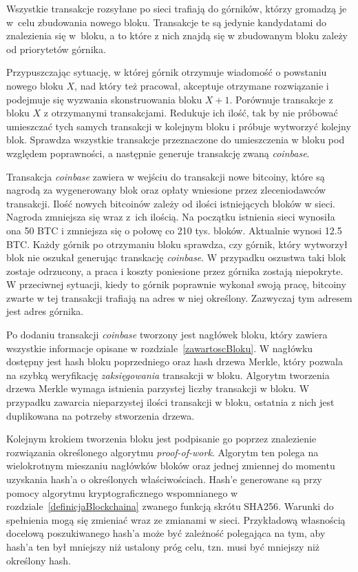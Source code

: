 \documentclass[12pt, twoside, final, openany]{mgr}
\begin{document}
\indent Wszystkie transakcje rozsyłane po sieci trafiają do górników, którzy gromadzą je w~celu zbudowania nowego bloku. Transakcje te są jedynie kandydatami do znalezienia się w~bloku, a to które z nich znajdą się w zbudowanym bloku zależy od priorytetów górnika. 

\indent Przypuszczając sytuację, w której górnik otrzymuje wiadomość o powstaniu nowego bloku $X$, nad który też pracował, akceptuje otrzymane rozwiązanie i podejmuje się wyzwania skonstruowania bloku $X+1$. Porównuje transakcje z bloku $X$ z otrzymanymi transakcjami. Redukuje ich ilość, tak by nie próbować umieszczać tych samych transakcji w kolejnym bloku i próbuje wytworzyć kolejny blok. Sprawdza wszystkie transakcje przeznaczone do umieszczenia w bloku pod względem poprawności, a następnie generuje transakcję zwaną \textit{coinbase}. 

\indent Transakcja \textit{coinbase} zawiera w wejściu do transakcji nowe bitcoiny, które są nagrodą za wygenerowany blok oraz opłaty wniesione przez zleceniodawców transakcji. Ilość nowych bitcoinów zależy od ilości istniejących bloków w sieci. Nagroda zmniejsza się wraz z~ich ilością. Na początku istnienia sieci wynosiła ona 50 BTC i zmniejsza się o połowę co 210 tys. bloków. Aktualnie wynosi 12.5 BTC. Każdy górnik po otrzymaniu bloku sprawdza, czy górnik, który wytworzył blok nie oszukał generując transkację \textit{coinbase}. W przypadku oszustwa taki blok zostaje odrzucony, a praca i koszty poniesione przez górnika zostają niepokryte. W przeciwnej sytuacji, kiedy to górnik poprawnie wykonał swoją pracę, bitcoiny zwarte w tej transakcji trafiają na adres w niej określony. Zazwyczaj tym adresem jest adres górnika.

\indent Po dodaniu transakcji \textit{coinbase} tworzony jest nagłówek bloku, który zawiera wszystkie informacje opisane w rozdziale~\ref{zawartoscBloku}. W nagłówku dostępny jest hash bloku poprzedniego oraz hash drzewa Merkle, który pozwala na szybką weryfikację \textit{zaksięgowania} transakcji w bloku. Algorytm tworzenia drzewa Merkle wymaga istnienia parzystej liczby transakcji w bloku. W przypadku zawarcia nieparzystej ilości transakcji w bloku, ostatnia z nich jest duplikowana na potrzeby stworzenia drzewa.

\indent Kolejnym krokiem tworzenia bloku jest podpisanie go poprzez znalezienie rozwiązania określonego algorytmu \textit{proof-of-work}. Algorytm ten polega na wielokrotnym mieszaniu nagłówków bloków oraz jednej zmiennej do momentu uzyskania hash'a o określonych właściwościach. Hash'e generowane są przy pomocy algorytmu kryptograficznego wspomnianego w rozdziale~\ref{definicjaBlockchaina} zwanego funkcją skrótu SHA256\cite{podstawyKryptografii}. Warunki do spełnienia mogą się zmieniać wraz ze zmianami w sieci. Przykładową własnością docelową poszukiwanego hash'a może być zależność polegająca na tym, aby hash'a ten był mniejszy niż ustalony próg celu, tzn. musi być mniejszy niż określony hash.
\end{document}
